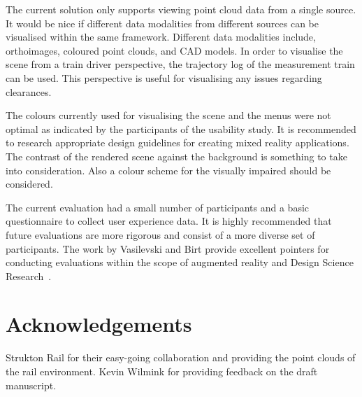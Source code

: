 The current solution only supports viewing point cloud data from a single source. It would be nice if different data modalities from different sources can be visualised within the same framework. Different data modalities include, orthoimages, coloured point clouds, and CAD models. In order to visualise the scene from a train driver perspective, the trajectory log of the measurement train can be used. This perspective is useful for visualising any issues regarding clearances.

The colours currently used for visualising the scene and the menus were not optimal as indicated by the participants of the usability study. It is recommended to research appropriate design guidelines for creating mixed reality applications. The contrast of the rendered scene against the background is something to take into consideration. Also a colour scheme for the visually impaired should be considered.

The current evaluation had a small number of participants and a basic questionnaire to collect user experience data. It is highly recommended that future evaluations are more rigorous and consist of a more diverse set of participants. The work by Vasilevski and Birt provide excellent pointers for conducting evaluations within the scope of augmented reality and Design Science Research~\cite{VasilevskiBirt21}. 

\section*{Acknowledgements}
Strukton Rail for their easy-going collaboration and providing the point clouds of the rail environment. Kevin Wilmink for providing feedback on the draft manuscript.
